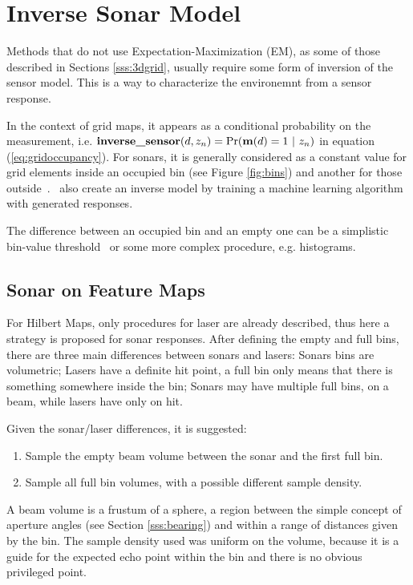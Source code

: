 \section{Inverse Sonar Model}
\label{s:ism}
Methods that do not use Expectation-Maximization (EM), as some of those
described in Sections \ref{sss:3dgrid}, usually require some form of inversion
of the sensor model. This is a way to characterize the environemnt from a sensor
response.

In the context of grid maps, it appears as a conditional probability on the
measurement, i.e.
$\text{\textbf{inverse\_sensor}}(d,z_n)=\Pr(\mathrm{\mathbf{m}}(d)=1~|~z_n)$ in equation
(\ref{eq:gridoccupancy}). For sonars, it is generally considered as a constant
value for grid elements inside an occupied bin (see Figure \ref{fig:bins}) and
another for those outside~\cite{thrunprob}.~\citet{thrunprob} also create an
inverse model by training a machine learning algorithm with generated responses.

The difference between an occupied bin and an empty one can be a simplistic
bin-value threshold~\cite{ribas2010underwater,Moravec1985,thrunprob} or some
more complex procedure, e.g. histograms. 

\subsection{Sonar on Feature Maps}
\label{ss:isfm}
For Hilbert Maps, only procedures for
laser are already described, thus here a strategy is proposed for sonar
responses. After defining the empty and full bins, there are three main
differences between sonars and lasers: Sonars bins are volumetric; Lasers have a
definite hit point, a full bin only means that there is something somewhere
inside the bin; Sonars may have multiple full bins, on a beam, while lasers have
only on hit.

Given the sonar/laser differences, it is suggested:
\begin{enumerate}[I]
  \item Sample the empty beam volume between the sonar and the first full bin.
  \item Sample all full bin volumes, with a possible different sample density. 
\end{enumerate}

A beam volume is a frustum of a sphere, a region between the simple concept of
aperture angles (see Section \ref{sss:bearing}) and within a range of distances
given by the bin. The sample density used was uniform on the volume, because
it is a guide for the expected echo point within the bin and there is no obvious
privileged point.

